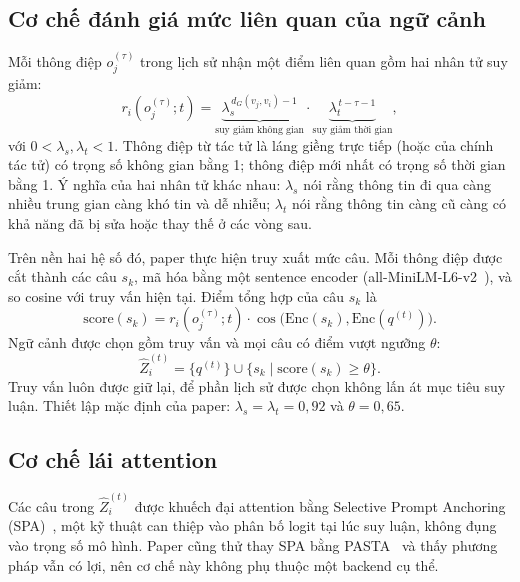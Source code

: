 \subsection{Cơ chế đánh giá mức liên quan của ngữ cảnh}
Mỗi thông điệp $o^{(\tau)}_j$ trong lịch sử nhận một điểm liên quan gồm hai nhân tử suy giảm:
\begin{equation}
r_i(o^{(\tau)}_j; t) = \underbrace{\lambda_s^{\,d_G(v_j, v_i) - 1}}_{\text{suy giảm không gian}} \cdot \underbrace{\lambda_t^{\,t - \tau - 1}}_{\text{suy giảm thời gian}},
\label{eq:ar-decay}
\end{equation}
với $0 < \lambda_s, \lambda_t < 1$. Thông điệp từ tác tử là láng giềng trực tiếp (hoặc của chính tác tử) có trọng số không gian bằng 1; thông điệp mới nhất có trọng số thời gian bằng 1. Ý nghĩa của hai nhân tử khác nhau: $\lambda_s$ nói rằng thông tin đi qua càng nhiều trung gian càng khó tin và dễ nhiễu; $\lambda_t$ nói rằng thông tin càng cũ càng có khả năng đã bị sửa hoặc thay thế ở các vòng sau.

Trên nền hai hệ số đó, paper thực hiện truy xuất mức câu. Mỗi thông điệp được cắt thành các câu $s_k$, mã hóa bằng một sentence encoder (all-MiniLM-L6-v2~\cite{reimers2019sbert}), và so cosine với truy vấn hiện tại. Điểm tổng hợp của câu $s_k$ là
\begin{equation}
\mathrm{score}(s_k) = r_i(o^{(\tau)}_j; t)\cdot \cos\big(\mathrm{Enc}(s_k), \mathrm{Enc}(q^{(t)})\big).
\label{eq:ar-score}
\end{equation}
Ngữ cảnh được chọn gồm truy vấn và mọi câu có điểm vượt ngưỡng $\theta$:
\begin{equation}
\hat{Z}^{(t)}_i = \{q^{(t)}\} \cup \big\{s_k \mid \mathrm{score}(s_k) \ge \theta\big\}.
\label{eq:ar-select}
\end{equation}
Truy vấn luôn được giữ lại, để phần lịch sử được chọn không lấn át mục tiêu suy luận. Thiết lập mặc định của paper: $\lambda_s = \lambda_t = 0{,}92$ và $\theta = 0{,}65$.

\subsection{Cơ chế lái attention}
Các câu trong $\hat{Z}^{(t)}_i$ được khuếch đại attention bằng Selective Prompt Anchoring (SPA)~\cite{tian2025spa}, một kỹ thuật can thiệp vào phân bố logit tại lúc suy luận, không đụng vào trọng số mô hình. Paper cũng thử thay SPA bằng PASTA~\cite{zhang2024pasta} và thấy phương pháp vẫn có lợi, nên cơ chế này không phụ thuộc một backend cụ thể.

